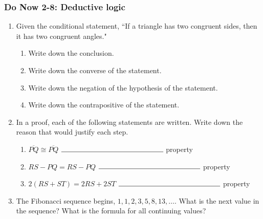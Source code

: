 \documentclass[12pt, oneside]{article}
\begin{document}
\subsubsection*{Do Now 2-8: Deductive logic}
  \vspace{0.5cm}
  \begin{enumerate}

    \item Given the conditional statement, ``If a triangle has two congruent sides, then it has two congruent angles."
      \begin{enumerate}
        \item Write down the conclusion. \vspace{1.5cm}
        \item Write down the converse of the statement. \vspace{1.5cm}
        \item Write down the negation of the hypothesis of the statement. \vspace{1.5cm}
        \item Write down the contrapositive of the statement. \vspace{2cm}
      \end{enumerate}


      \item In a proof, each of the following statements are written. Write down the reason that would justify each step. \bigskip
        \begin{enumerate}
          \item $\overline{PQ} \cong \overline{PQ}$ \hspace{4cm} $\rule{5cm}{0.15mm}$ property \bigskip
          \item $RS - PQ= RS-PQ$  \hspace{1.7cm} $\rule{5cm}{0.15mm}$ property \bigskip
          \item $2(RS + ST)=2RS+2ST$  \hspace{0.8cm} $\rule{5cm}{0.15mm}$ property
        \end{enumerate} \bigskip

      \item The Fibonacci sequence begins, $1, 1, 2, 3, 5, 8, 13, \dots$. What is the next value in the sequence? What is the formula for all continuing values?


\end{enumerate}
\end{document}
